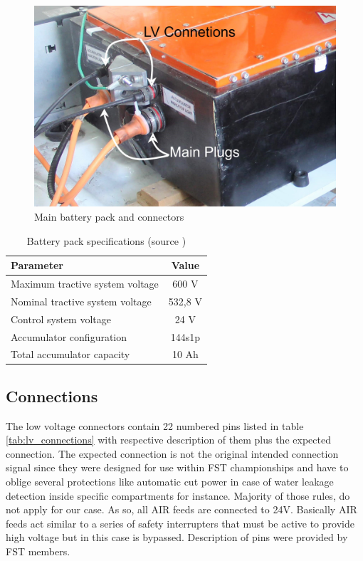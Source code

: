 \begin{figure}[!h]
	\centering
	\includegraphics[width=0.7\linewidth]{figures/main_battery_connections}
	\caption{Main battery pack and connectors}
	\label{fig:battery_connections}
\end{figure}

\begin{table}[!hb]
	\centering
	\begin{tabular}{lc}
		\toprule
		\textbf{Parameter} & \textbf{Value}\\
		\midrule
		Maximum tractive system voltage & 600 V \\
		Nominal tractive system voltage & 532,8 V \\
		Control system voltage & 24 V \\
		Accumulator configuration & 144s1p \\
		Total accumulator capacity & 10 Ah\\
		\bottomrule
	\end{tabular}
	\caption[Battery pack specifications]{Battery pack specifications (source \cite{fst06})}
	\label{tab:battery_pack_specs}
\end{table}

\subsection{Connections}
The low voltage connectors contain 22 numbered pins listed in table \ref{tab:lv_connections} with respective description of them plus the expected connection. The expected connection is not the original intended connection signal since they were designed for use within \gls{FST} championships and have to oblige several protections like automatic cut power in case of water leakage detection inside specific compartments for instance. Majority of those rules, do not apply for our case. As so, all \gls{AIR} feeds are connected to 24V. Basically \gls{AIR} feeds act similar to a series of safety interrupters that must be active to provide high voltage but in this case is bypassed. Description of pins were provided by \gls{FST} members.

